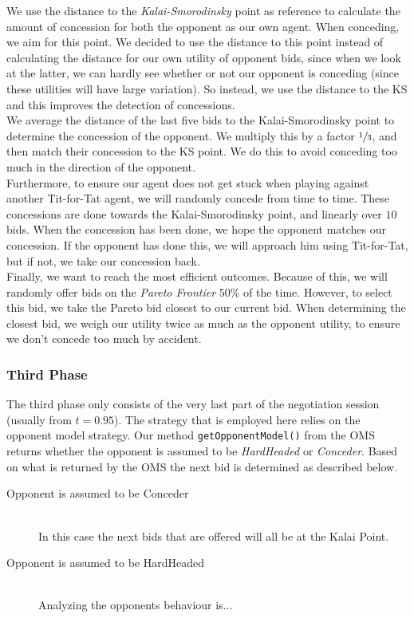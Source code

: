 We use the distance to the \emph{Kalai-Smorodinsky} point as reference to calculate
the amount of concession for both the opponent as our own agent. When conceding, we aim for this point.
We decided to use the distance to this point instead of calculating the distance for our own utility of opponent bids, since when we look at the latter, we can hardly see whether or not
our opponent is conceding (since these utilities will have large variation). So instead, we use the distance to the KS and this improves the detection of concessions. \\

We average the distance of the last five bids to the Kalai-Smorodinsky point to determine the concession of the opponent. We
multiply this by a factor $\sfrac{1}{3}$, and then match their concession to the KS point.
We do this to avoid conceding too much in the direction of the opponent. \\

Furthermore, to ensure our agent does not get stuck when playing against 
another Tit-for-Tat agent, we will randomly concede from time to time. 
These concessions are done towards the Kalai-Smorodinsky point, and linearly over 
$10$ bids. When the concession has been done, we hope the opponent matches 
our concession. If the opponent has done this, we will approach him
using Tit-for-Tat, but if not, we take our concession back. \\

Finally, we want to reach the most efficient outcomes. Because of this,
we will randomly offer bids on the \emph{Pareto Frontier} $50\%$ of the time.
However, to select this bid, we take the Pareto bid closest to our current bid.
When determining the closest bid, we weigh our utility twice as much
as the opponent utility, to ensure we don't concede too much by accident.

\subsubsection{Third Phase}

The third phase only consists of the very last part of the negotiation session (usually from $t=0.95$). The strategy that is employed here relies on the opponent model strategy. Our method \texttt{getOpponentModel()} from the OMS returns whether the opponent is assumed to be \emph{HardHeaded} or \emph{Conceder}. Based on what is returned by the OMS the next bid is determined as described below.

\begin{description}
  \item[Opponent is assumed to be Conceder] \hfill \\
  In this case the next bids that are offered will all be at the Kalai Point.

  \item[Opponent is assumed to be HardHeaded] \hfill \\
  Analyzing the opponents behaviour is...
\end{description}

